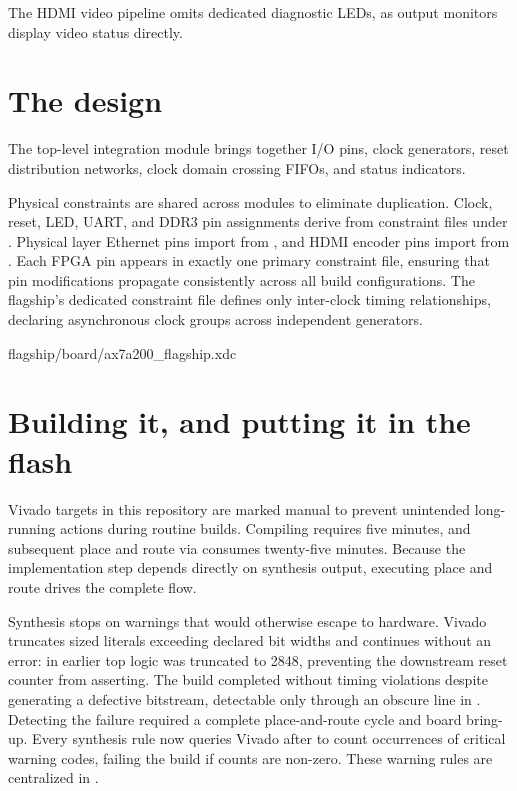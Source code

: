 \documentclass[journal,9pt]{IEEEtran}
\begin{document}
The HDMI video pipeline omits dedicated diagnostic LEDs, as output monitors
display video status directly.

\section{The design}
\label{sec:f-top}

The top-level integration module brings together I/O pins, clock generators,
reset distribution networks, clock domain crossing FIFOs, and status
indicators.



Physical constraints are shared across modules to eliminate duplication. Clock,
reset, LED, UART, and DDR3 pin assignments derive from constraint files under
. Physical layer Ethernet pins import from
, and HDMI encoder pins import from
. Each FPGA pin appears in exactly one primary
constraint file, ensuring that pin modifications propagate consistently across
all build configurations. The flagship's dedicated constraint file defines only
inter-clock timing relationships, declaring asynchronous clock groups across
independent generators.

%
{flagship/board/ax7a200_flagship.xdc}

\section{Building it, and putting it in the flash}
\label{sec:f-build}

Vivado targets in this repository are marked manual to prevent unintended
long-running actions during routine builds. Compiling
 requires five minutes, and subsequent place
and route via  consumes twenty-five minutes.
Because the implementation step depends directly on synthesis output, executing
place and route drives the complete flow.

Synthesis stops on warnings that would otherwise escape to hardware. Vivado
truncates sized literals exceeding declared bit widths and continues without an
error:  in earlier top logic was truncated to 2848,
preventing the downstream reset counter from asserting. The build completed
without timing violations despite generating a defective bitstream, detectable
only through an obscure line in . Detecting the failure
required a complete place-and-route cycle and board bring-up. Every synthesis
rule now queries Vivado after  to count occurrences of
critical warning codes, failing the build if counts are non-zero. These warning
rules are centralized in .
\end{document}
